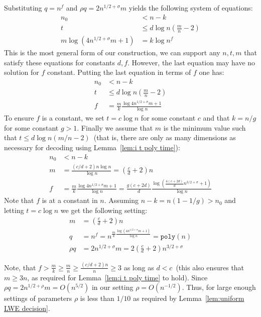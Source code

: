 \documentclass[11pt]{article}
\newcommand{\lemref}[1]{\mbox{Lemma~\ref{#1}}}
\newcommand{\poly}{\ensuremath{\mathtt{poly}}\xspace}
\newcommand{\authnote}[2]{{\textcolor{red}{\textsf{#1 notes: }\textcolor{blue}{ #2}}\marginpar{\textcolor{red}{\textbf{!!!!!}}}}}
\newcommand{\authnote}[2]{}
\newcommand{\xnote}[1]{{\authnote{Xianrui}{#1}}}
\begin{document}
Substituting $q = n^f$ and $\rho q = 2n^{1/2+\sigma}m$ yields the following system of equations:
\begin{align*}
n_0&< n - k\\
t&\leq d\log n\left(\frac{m}{n}-2\right)\\
m \log (4n^{1/2+\sigma}m +1)&= k \log n^f
\end{align*}
This is the most general form of our construction, we can support any $n, t, m$ that satisfy these equations for constants $d, f$.  However, the last equation may have no solution for $f$ constant.  Putting the last equation in terms of $f$ one has:
\begin{align*}
n_0&< n -k \\
t&\leq d\log n\left(\frac{ m }{n} -2\right)\\
f &= \frac{m}{k}\frac{\log 4n^{1/2+\sigma} m+1}{\log n}
\end{align*}
To ensure $f$ is a constant, we set $t = c \log n$ for some constant $c$ and that $k = n /g$ for some constant $g> 1$.  Finally we assume that $m$ is the minimum value such that $t \leq d \log n(m/n-2)$~(that is, there are only as many dimensions as necessary for decoding using \lemref{lem:i t poly time}):
\begin{align*}
n_0&< n -k \\
m &= \frac{(c/d+2)n \log n}{\log n} = (\frac{c}{d}+2)n\\
f &= \frac{m}{k}\frac{\log 4n^{1/2+\sigma}m+1}{\log n} = \frac{g(c+2d)}{d}\frac{\log (\frac{4(c+2d)}{d} n^{3/2+\sigma}+1)}{\log n}
\end{align*}
Note that $f$ is at a constant in $n$.
Assuming $n-k = n(1-1/g) > n_0$ and letting $t= c\log n$ we get the following setting:
\begin{align*}
m &= (\frac{c}{d}+2)n\\
q & = n^f = n^{\frac{m}{k}\frac{\log (4n^{1/2+\sigma}m+1)}{\log n}} = \poly(n)\\
\rho q &= 2n^{1/2+\sigma}m = 2(\frac{c}{d}+2)n^{3/2+\sigma}
\end{align*}

Note, that $f> \frac{m}{k}\geq \frac{m}{n} \geq \frac{(c/d+2)n}{n} \geq 3$ as long as $d<c$~(this also ensures that $m\geq 3n$, as required for \lemref{lem:i t poly time} to hold).  Since $\rho q = 2n^{1/2+\rho }m = O(n^{5/2})$ in our setting $\rho = O(n^{-1/2})$.  Thus, for large enough settings of parameters $\rho$ is less than $1/10$ as required by \lemref{lem:uniform LWE decision}.
\end{document}
